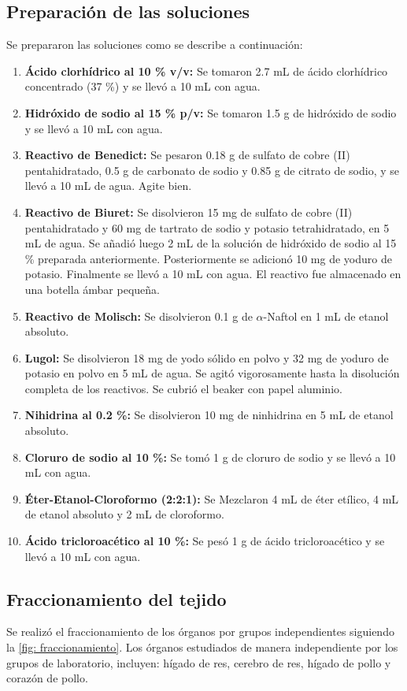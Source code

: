 \documentclass[fleqn,10pt]{SelfArx}
\begin{document}
	\subsection{Preparación de las soluciones}
		Se prepararon las soluciones como se describe a continuación:
		\begin{enumerate}
			\item \textbf{Ácido clorhídrico al 10 \% v/v:} Se tomaron 2.7 mL de ácido clorhídrico concentrado (37 \%) y se llevó a 10 mL con agua.
			\item \textbf{Hidróxido de sodio al 15 \% p/v:} Se tomaron 1.5 g de hidróxido de sodio y se llevó a 10 mL con agua.
			\item \textbf{Reactivo de Benedict:} Se pesaron 0.18 g de sulfato de cobre (II) pentahidratado, 0.5 g de carbonato de sodio y 0.85 g de citrato de sodio, y se llevó a 10 mL de agua. Agite bien.
			\item \textbf{Reactivo de Biuret:} Se disolvieron 15 mg de sulfato de cobre (II) pentahidratado y 60 mg de tartrato de sodio y potasio tetrahidratado, en 5 mL de agua. Se añadió luego 2 mL de la solución de hidróxido de sodio al 15 \% preparada anteriormente. Posteriormente se adicionó 10 mg de yoduro de potasio. Finalmente se llevó a 10 mL con agua. El reactivo fue almacenado en una botella ámbar pequeña.
			\item \textbf{Reactivo de Molisch:} Se disolvieron 0.1 g de $\alpha$-Naftol en 1 mL de etanol absoluto.
			\item \textbf{Lugol:} Se disolvieron 18 mg de yodo sólido en polvo y 32 mg de yoduro de potasio en polvo en 5 mL de agua. Se agitó vigorosamente hasta la disolución completa de los reactivos. Se cubrió el beaker con papel aluminio.
			\item \textbf{Nihidrina al 0.2 \%:} Se disolvieron 10 mg de ninhidrina en 5 mL de etanol absoluto.
			\item \textbf{Cloruro de sodio al 10 \%:} Se tomó 1 g de cloruro de sodio y se llevó a 10 mL con agua.
			\item \textbf{Éter-Etanol-Cloroformo (2:2:1):} Se Mezclaron 4 mL de éter etílico, 4 mL de etanol absoluto y 2
			mL de cloroformo.
			\item \textbf{Ácido tricloroacético al 10 \%:} Se pesó 1 g de ácido tricloroacético y se llevó a 10 mL con agua.
		\end{enumerate}
	\subsection{Fraccionamiento del tejido}
		Se realizó el fraccionamiento de los órganos por grupos independientes siguiendo la \autoref{fig: fraccionamiento}. Los órganos estudiados de manera independiente por los grupos de laboratorio, incluyen: hígado de res, cerebro de res, hígado de pollo y corazón de pollo.
		
\end{document}
